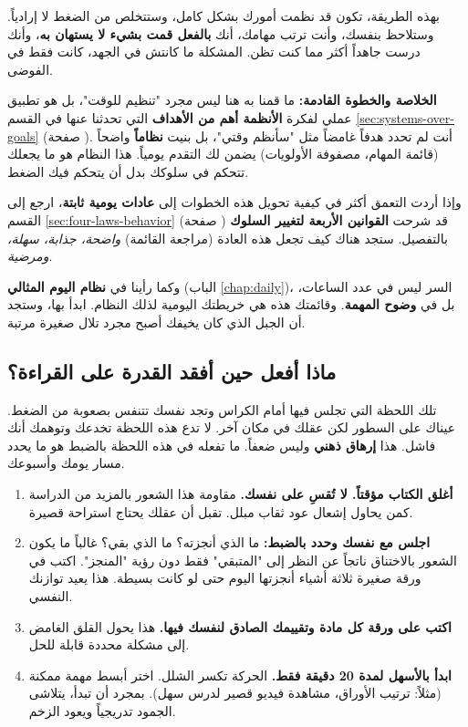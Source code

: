 \documentclass[12pt,a4paper]{book}
\begin{document}
	بهذه الطريقة، تكون قد نظمت أمورك بشكل كامل، وستتخلص من الضغط لا إرادياً. وستلاحظ بنفسك، وأنت ترتب مهامك، أنك \textbf{بالفعل قمت بشيء لا يستهان به}، وأنك درست جاهداً أكثر مما كنت تظن. المشكلة ما كانتش في الجهد، كانت فقط في الفوضى.
	
	\vspace{1em}
	\textbf{الخلاصة والخطوة القادمة:}
	ما قمنا به هنا ليس مجرد "تنظيم للوقت"، بل هو تطبيق عملي لفكرة \textbf{الأنظمة أهم من الأهداف} التي تحدثنا عنها في القسم \ref{sec:systems-over-goals} (صفحة \pageref{sec:systems-over-goals}). أنت لم تحدد هدفاً غامضاً مثل "سأنظم وقتي"، بل بنيت \textbf{نظاماً} واضحاً (قائمة المهام، مصفوفة الأولويات) يضمن لك التقدم يومياً. هذا النظام هو ما يجعلك تتحكم في سلوكك بدل أن يتحكم فيك الضغط.
	
	وإذا أردت التعمق أكثر في كيفية تحويل هذه الخطوات إلى \textbf{عادات يومية ثابتة}، ارجع إلى القسم \ref{sec:four-laws-behavior} (صفحة \pageref{sec:four-laws-behavior}) قد شرحت \textbf{القوانين الأربعة لتغيير السلوك} بالتفصيل. ستجد هناك كيف تجعل هذه العادة (مراجعة القائمة) \textit{واضحة، جذابة، سهلة، ومرضية}.
	
	وكما رأينا في \textbf{نظام اليوم المثالي} (الباب \ref{chap:daily})، السر ليس في عدد الساعات، بل في \textbf{وضوح المهمة}. وقائمتك هذه هي خريطتك اليومية لذلك النظام. ابدأ بها، وستجد أن الجبل الذي كان يخيفك أصبح مجرد تلال صغيرة مرتبة.
	
	\subsection{ماذا أفعل حين أفقد القدرة على القراءة؟}
	
	تلك اللحظة التي تجلس فيها أمام الكراس وتجد نفسك تتنفس بصعوبة من الضغط. عيناك على السطور لكن عقلك في مكان آخر. لا تدع هذه اللحظة تخدعك وتوهمك أنك فاشل. هذا \textbf{إرهاق ذهني} وليس ضعفاً. ما تفعله في هذه اللحظة بالضبط هو ما يحدد مسار يومك وأسبوعك.
	
	\begin{enumerate}
		\item \textbf{أغلق الكتاب مؤقتاً. لا تُقسِ على نفسك.} مقاومة هذا الشعور بالمزيد من الدراسة كمن يحاول إشعال عود ثقاب مبلل. تقبل أن عقلك يحتاج استراحة قصيرة.
		\item \textbf{اجلس مع نفسك وحدد بالضبط:} ما الذي أنجزته؟ ما الذي بقي؟ غالباً ما يكون الشعور بالاختناق ناتجاً عن النظر إلى "المتبقي" فقط دون رؤية "المنجز". اكتب في ورقة صغيرة ثلاثة أشياء أنجزتها اليوم حتى لو كانت بسيطة. هذا يعيد توازنك النفسي.
		\item \textbf{اكتب على ورقة كل مادة وتقييمك الصادق لنفسك فيها.} هذا يحول القلق الغامض إلى مشكلة محددة قابلة للحل.
		\item \textbf{ابدأ بالأسهل لمدة 20 دقيقة فقط.} الحركة تكسر الشلل. اختر أبسط مهمة ممكنة (مثلاً: ترتيب الأوراق، مشاهدة فيديو قصير لدرس سهل). بمجرد أن تبدأ، يتلاشى الجمود تدريجياً ويعود الزخم.
	\end{enumerate}
	
\end{document}
